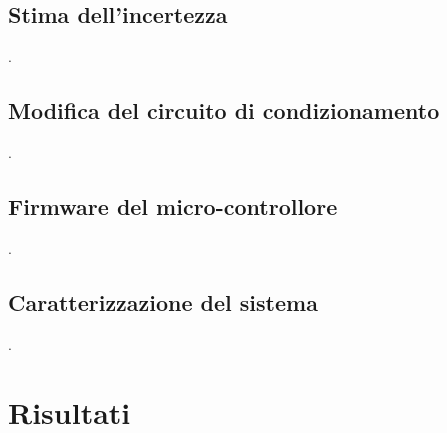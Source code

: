 \documentclass[a4paper]{article}
\begin{document}
		\subsection{Stima dell'incertezza}
			.
		\subsection{Modifica del circuito di condizionamento}
			.
		\subsection{Firmware del micro-controllore}
			.
		\subsection{Caratterizzazione del sistema}
			.
	\section{Risultati}
\end{document}
